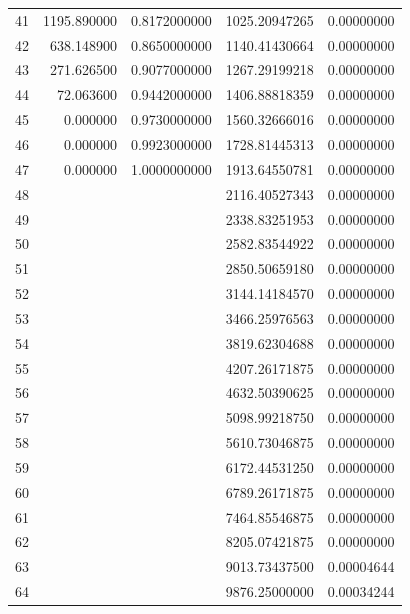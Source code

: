 \begin{center}
\begin{xtabular}{|r||rr||rr|}
41 &  1195.890000  & 0.8172000000 &     1025.20947265 & 0.00000000 \\
42 &   638.148900  & 0.8650000000 &     1140.41430664 & 0.00000000 \\
43 &   271.626500  & 0.9077000000 &     1267.29199218 & 0.00000000 \\
44 &    72.063600  & 0.9442000000 &     1406.88818359 & 0.00000000 \\
45 &     0.000000  & 0.9730000000 &     1560.32666016 & 0.00000000 \\
46 &     0.000000  & 0.9923000000 &     1728.81445313 & 0.00000000 \\
47 &     0.000000  & 1.0000000000 &     1913.64550781 & 0.00000000 \\
48 &               &              &     2116.40527343 & 0.00000000 \\
49 &               &              &     2338.83251953 & 0.00000000 \\
50 &               &              &     2582.83544922 & 0.00000000 \\
51 &               &              &     2850.50659180 & 0.00000000 \\
52 &               &              &     3144.14184570 & 0.00000000 \\
53 &               &              &     3466.25976563 & 0.00000000 \\
54 &               &              &     3819.62304688 & 0.00000000 \\
55 &               &              &     4207.26171875 & 0.00000000 \\
56 &               &              &     4632.50390625 & 0.00000000 \\
57 &               &              &     5098.99218750 & 0.00000000 \\
58 &               &              &     5610.73046875 & 0.00000000 \\
59 &               &              &     6172.44531250 & 0.00000000 \\
60 &               &              &     6789.26171875 & 0.00000000 \\
61 &               &              &     7464.85546875 & 0.00000000 \\
62 &               &              &     8205.07421875 & 0.00000000 \\
63 &               &              &     9013.73437500 & 0.00004644 \\
64 &               &              &     9876.25000000 & 0.00034244 \\

\end{xtabular}
\end{center}
